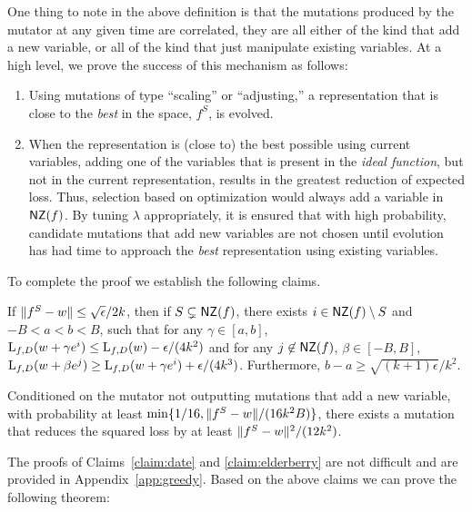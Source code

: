 One thing to note in the above definition is that the mutations produced by the
mutator at any given time are correlated, \ie they are all either of the kind
that add a new variable, or all of the kind that just manipulate existing
variables.  At a high level, we prove the success of this mechanism as follows:
\begin{enumerate}
%
\item Using mutations of type ``scaling'' or ``adjusting,'' a representation
that is close to the \emph{best} in the space, \ie $f^S$, is evolved.
%
\item When the representation is (close to) the best possible using current
variables, adding one of the variables that is present in the \emph{ideal
function}, but not in the current representation, results in the greatest
reduction of expected loss. Thus, selection based on optimization would always
add a variable in $\mathsf{NZ}(f)$. By tuning $\lambda$ appropriately, it is ensured
that with high probability, candidate mutations that add new variables are not
chosen until evolution has had time to approach the \emph{best} representation
using existing variables.
%
\end{enumerate}

To complete the proof we establish the following claims.

\begin{claim} \label{claim:date} If $\Vert f^S - w \Vert \leq
\sqrt{\epsilon}/{2k}$, then if $S \subsetneq \mathsf{NZ}(f)$, there exists $i \in \mathsf{NZ}(f)
\setminus S$ and $-B < a < b < B$, such that for any $\gamma \in [a, b]$,
$\mathrm{L}_{f, D}(w + \gamma e^i) \leq \mathrm{L}_{f, D}(w) - \epsilon/(4k^2)$ and for
any $j \not\in \mathsf{NZ}(f)$, $\beta \in [-B, B]$, $\mathrm{L}_{f, D}(w + \beta e^j) \geq
\mathrm{L}_{f, D}(w + \gamma e^i) + \epsilon/(4k^3)$. Furthermore, $b - a \geq
\sqrt{(k+1) \epsilon}/k^2$. \end{claim}

\begin{claim} \label{claim:elderberry} Conditioned on the mutator not outputting
mutations that add a new variable, with probability at least $\min\{1/16,
\Vert f^S - w \Vert/(16k^2B)\}$, there exists a mutation that reduces the squared
loss by at least $\Vert f^S - w \Vert^2/(12k^2)$. \end{claim}

The proofs of Claims~\ref{claim:date} and \ref{claim:elderberry} are not
difficult and are provided in Appendix~\ref{app:greedy}. Based on the above
claims we can prove the following theorem:

